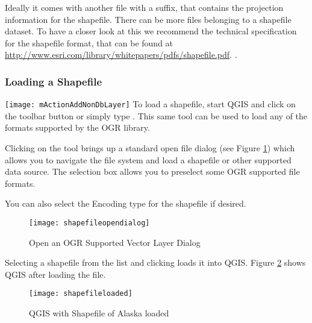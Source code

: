 Ideally it comes with another file with a  suffix, that contains
the projection information for the shapefile. There can be more files belonging 
to a shapefile dataset. To have a closer look at this we recommend the technical 
specification for the shapefile format, that can be found at \url{http://www.esri.com/library/whitepapers/pdfs/shapefile.pdf}.
.

\subsubsection{Loading a Shapefile}\label{sec:load_shapefile}
\texttt{[image: mActionAddNonDbLayer]} 
To load a shapefile, start
QGIS and click on the 
toolbar button or simply type . This same tool can be used to
load any of the formats supported by the OGR library.

Clicking on the tool brings up a standard open file dialog (see Figure
\ref{fig:openshapefile}) which allows you to navigate the file system and load
a shapefile or other supported data source. 
The selection box  allows you to preselect some OGR supported file formats.

You can also select the Encoding type for the shapefile if desired.

\begin{figure}[ht]
   \begin{center}
   \caption{Open an OGR Supported Vector Layer Dialog \nixcaption}\label{fig:openshapefile}\smallskip
   \texttt{[image: shapefileopendialog]}
\end{center} 
\end{figure}

Selecting a shapefile from the list and clicking  loads it into QGIS. Figure
\ref{fig:loadedshapefile} shows QGIS after loading the  file.

\begin{figure}[ht]
   \begin{center}
   \caption{QGIS with Shapefile of Alaska loaded \nixcaption}\label{fig:loadedshapefile}\smallskip
   \texttt{[image: shapefileloaded]}
\end{center} 
\end{figure}

\begin{Tip}\caption{\textsc{Layer Colors}}
\end{Tip}

